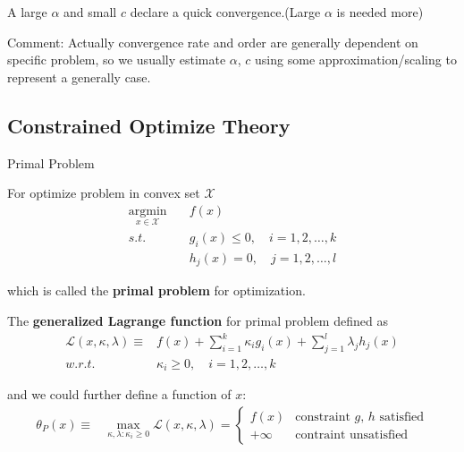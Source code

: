      A large $ \alpha  $ and small $ c $ declare a quick convergence.(Large $ \alpha  $ is needed more)

    Comment: Actually convergence rate and order are generally dependent on specific problem, so we usually estimate $ \alpha  $, $ c $ using some approximation/scaling to represent a generally case.

\subsection{Constrained Optimize Theory}\label{ConstrainedOptimizeTheory}
\begin{point}
    Primal Problem
\end{point}


    For optimize problem in convex set $ \mathcal{X} $
\begin{align}
        \mathop{\arg\min}\limits_{x\in\mathcal{X}}\quad &f(x)\tag{P}\\
        s.t.\quad   &g_i(x)\leq 0,\quad i=1,2,\ldots,k\\
        & h_j(x)=0,\quad j=1,2,\ldots,l
\end{align}

    which is called the \textbf{primal problem} for optimization.
    
    The \textbf{generalized Lagrange function} for primal problem defined as 
\begin{equation}\label{EqaGeneralizedLagrangeFunction}
 \begin{aligned}
    \mathcal{L}(x,\kappa ,\lambda )\equiv& f(x)+\sum_{i=1}^k\kappa _ig_i(x)+\sum_{j=1}^l\lambda _jh_j(x) \\
    w.r.t. \quad&\kappa _i\geq 0,\quad i=1,2,\ldots,k
\end{aligned}   
\end{equation}

        
    and we could further define a function of $ x $:
\begin{align}
    \theta _P(x)\equiv& \mathop{\max}\limits_{\kappa ,\lambda :\kappa _i\geq 0}\mathcal{L}(x,\kappa ,\lambda ) =\begin{cases}
            f(x)&\text{constraint } g,\,h \text{ satisfied}\\
            +\infty &\text{contraint unsatisfied}
        \end{cases}
\end{align}
       

